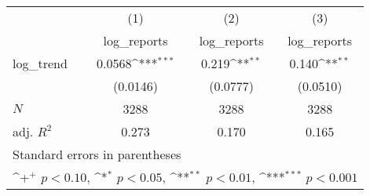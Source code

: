 {
\def\sym#1{\ifmmode^{#1}\else\(^{#1}\)\fi}
\begin{tabular}{l*{3}{c}}
\hline\hline
            &\multicolumn{1}{c}{(1)}&\multicolumn{1}{c}{(2)}&\multicolumn{1}{c}{(3)}\\
            &\multicolumn{1}{c}{log\_reports}&\multicolumn{1}{c}{log\_reports}&\multicolumn{1}{c}{log\_reports}\\
\hline
log\_trend   &      0.0568\sym{***}&       0.219\sym{**} &       0.140\sym{**} \\
            &    (0.0146)         &    (0.0777)         &    (0.0510)         \\
\hline
\(N\)       &        3288         &        3288         &        3288         \\
adj. \(R^{2}\)&       0.273         &       0.170         &       0.165         \\
\hline\hline
\multicolumn{4}{l}{\footnotesize Standard errors in parentheses}\\
\multicolumn{4}{l}{\footnotesize \sym{+} \(p<0.10\), \sym{*} \(p<0.05\), \sym{**} \(p<0.01\), \sym{***} \(p<0.001\)}\\
\end{tabular}
}
